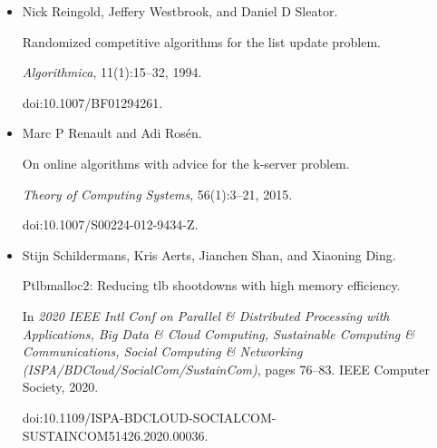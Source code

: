 \documentclass[10pt,a4paper]{article}
\begin{document}
\begin{itemize}
Sharath Raghvendra and Rachita Sowle.


A Scalable Work Function Algorithm for the k-Server Problem.


In \emph{18th Scandinavian Symposium and Workshops on Algorithm Theory
(SWAT 2022)}, volume 227 of \emph{Leibniz International Proceedings in
Informatics (LIPIcs)}, pages 30:1–30:20. Schloss Dagstuhl – Leibniz-Zentrum
für Informatik, 2022.


doi:10.4230/LIPIcs.SWAT.2022.30.





\item[] 
[32]

Nick Reingold, Jeffery Westbrook, and Daniel D Sleator.


Randomized competitive algorithms for the list update problem.


\emph{Algorithmica}, 11(1):15–32, 1994.


doi:10.1007/BF01294261.





\item[] 
[33]

Marc P Renault and Adi Rosén.


On online algorithms with advice for the k-server problem.


\emph{Theory of Computing Systems}, 56(1):3–21, 2015.


doi:10.1007/S00224-012-9434-Z.





\item[] 
[34]

Stijn Schildermans, Kris Aerts, Jianchen Shan, and Xiaoning Ding.


Ptlbmalloc2: Reducing tlb shootdowns with high memory efficiency.


In \emph{2020 IEEE Intl Conf on Parallel \& Distributed Processing
with Applications, Big Data \& Cloud Computing, Sustainable Computing \&
Communications, Social Computing \& Networking
(ISPA/BDCloud/SocialCom/SustainCom)}, pages 76–83. IEEE Computer Society,
2020.


doi:10.1109/ISPA-BDCLOUD-SOCIALCOM-SUSTAINCOM51426.2020.00036.





\end{itemize}
\end{document}
